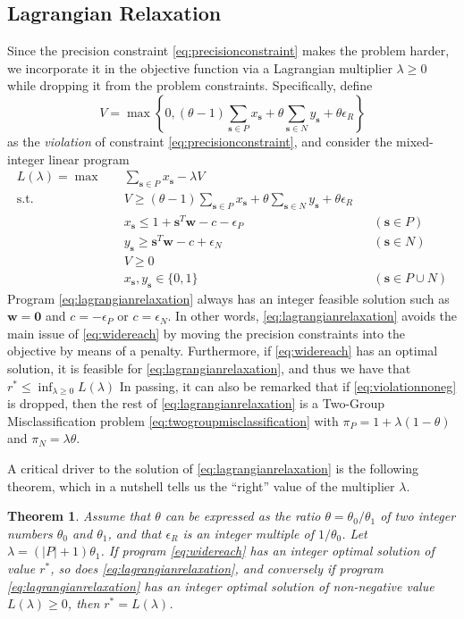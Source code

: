 \documentclass[11pt]{article}
\newtheorem{theorem}{Theorem}[section]
\theoremstyle{definition}
\newcommand{\vect}[1]{\mathbf{#1}}
\newcommand{\sv}[1]{_{\vect{#1}}}
\begin{document}
\subsection{Lagrangian Relaxation}
Since the precision constraint \eqref{eq:precisionconstraint} 
makes the problem harder, we incorporate it in the objective
function via a Lagrangian multiplier $\lambda \geq 0$ while dropping it 
from the problem constraints.
Specifically, define
$$V = \max \left\{ 0, 
(\theta  - 1) \sum_{\vect{s} \in P} x\sv{s} + 
\theta \sum_{\vect{s} \in N} y\sv{s} + \theta \epsilon_R \right\}$$
as the {\em violation\/} of constraint \eqref{eq:precisionconstraint},
and consider the mixed-integer linear program
\begin{subequations}
\label{eq:lagrangianrelaxation}
\begin{align}
L(\lambda) = \max\quad & \sum_{\vect{s} \in P} x\sv{s} - \lambda V \\
\text{s.t.}\quad & 
V \geq (\theta  - 1) \sum_{\vect{s} \in P} x\sv{s} + 
\theta \sum_{\vect{s} \in N} y\sv{s} + \theta \epsilon_R \\
& x\sv{s} \leq 1 + \vect{s}^T \vect{w} - c - \epsilon_P & & (\vect{s} \in P) \\
& y\sv{s} \geq \vect{s}^T \vect{w} - c + \epsilon_N & & (\vect{s} \in N) \\
\label{eq:violationnoneg}
& V \geq 0 \\
& x\sv{s}, y\sv{s} \in \{ 0, 1 \} & & (\vect{s} \in P \cup N) 
\end{align}
\end{subequations}
Program \eqref{eq:lagrangianrelaxation} always has an integer feasible solution
such as $\vect{w} = \vect{0}$ and $c = - \epsilon_P$ or $c = \epsilon_N$.
In other words, \eqref{eq:lagrangianrelaxation} avoids the main issue of
\eqref{eq:widereach} by moving the precision constraints into the objective
by means of a penalty.
Furthermore, if \eqref{eq:widereach} has an optimal solution,
it is feasible for \eqref{eq:lagrangianrelaxation}, and thus we have
that $r^* \leq \inf_{\lambda \geq 0} L(\lambda)$
In passing, it can also be remarked that if \eqref{eq:violationnoneg} is dropped,
then the rest of \eqref{eq:lagrangianrelaxation} is a Two-Group Misclassification
problem \eqref{eq:twogroupmisclassification} with 
$\pi_P = 1 + \lambda (1 - \theta)$ and $\pi_N = \lambda \theta$.

A critical driver to the solution of \eqref{eq:lagrangianrelaxation} is 
the following theorem, which in a nutshell tells us the ``right'' value
of the multiplier $\lambda$.
\begin{theorem}
Assume that $\theta$ can be expressed as the ratio $\theta = \theta_0 / \theta_1$
of two integer numbers $\theta_0$ and $\theta_1$, and that 
$\epsilon_R$ is an integer multiple of $1 / \theta_0$.
Let $\lambda = (|P| + 1) \theta_1$.
If program \eqref{eq:widereach} has an integer optimal solution of value $r^*$,
so does \eqref{eq:lagrangianrelaxation}, and conversely 
if program \eqref{eq:lagrangianrelaxation} has an integer optimal solution
of non-negative value $L(\lambda) \geq 0$, then $r^* = L(\lambda)$.
\end{theorem}
\end{document}

